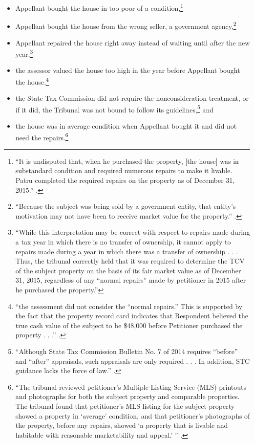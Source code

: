 \documentclass[12pt,\documentclassflag]{michiganCourtOfAppealsBrief}
\begin{document}
\begin{itemize}
\item Appellant bought the house in too poor of a condition,\footnote{``It is undisputed that, when he purchased the property, [the house] was in substandard condition and required numerous repairs to make it livable. Patru completed the required repairs on the property as of December 31, 2015.''
.
}
\item Appellant bought the house from the wrong seller, a government agency,\footnote{``Because the subject was being sold by a government entity, that entity’s motivation may
not have been to receive market value for the property.'' .}
\item Appellant repaired the house right away instead of waiting until after the new year,\footnote{``While this interpretation may be correct with respect to repairs
made during a tax year in which there is no transfer of ownership, it cannot apply to repairs made
during a year in which there was a transfer of ownership . . . Thus, the tribunal correctly
held that it was required to determine the TCV of the subject property on the basis of its fair market
value as of December 31, 2015, regardless of any ``normal repairs'' made by petitioner in 2015
after he purchased the property.'' }
\item the assessor valued the house too high in the year before Appellant bought the house,\footnote{``the
assessment did not consider the ``normal repairs.'' This is supported by the fact that the
property record card indicates that Respondent believed the true cash value of the
subject to be \$48,000 before Petitioner purchased the property . . .'' .}
\item the State Tax Commission did not require the nonconsideration treatment, or if it did, the Tribunal was not bound to follow its guidelines,\footnote{``Although State Tax
Commission Bulletin No. 7 of 2014 requires ``before'' and ``after'' appraisals, such appraisals are only
required . . . In addition, STC guidance lacks the force of law.'' .} and 
\item the house was in average condition when Appellant bought it and did not need the repairs.\footnote{``The tribunal reviewed petitioner's Multiple Listing Service (MLS) printouts and
photographs for both the subject property and comparable properties. The tribunal found that
petitioner's MLS listing for the subject property showed a property in `average' condition, and
that petitioner's photographs of the property, before any repairs, showed `a property that is livable
and habitable with reasonable marketability and appeal.' '' .}
\end{itemize}
\end{document}
